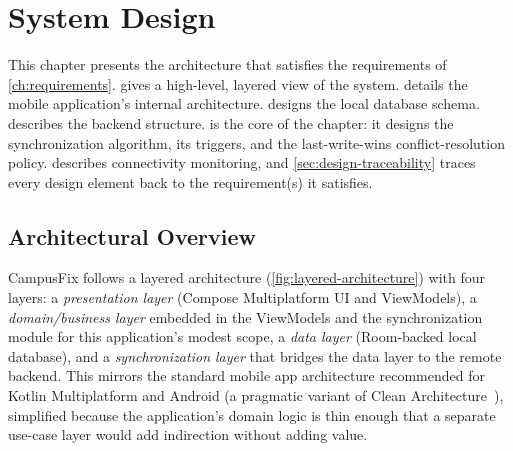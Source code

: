 \chapter{System Design}
\label{ch:design}

This chapter presents the architecture that satisfies the requirements of
\cref{ch:requirements}.  gives a high-level,
layered view of the system.  details the
mobile application's internal architecture. 
designs the local database schema.  describes the
backend structure.  is the core of the chapter: it
designs the synchronization algorithm, its triggers, and the
last-write-wins conflict-resolution policy. 
describes connectivity monitoring, and \cref{sec:design-traceability}
traces every design element back to the requirement(s) it satisfies.

\section{Architectural Overview}
\label{sec:architecture-overview}

CampusFix follows a layered architecture (\cref{fig:layered-architecture})
with four layers: a \emph{presentation layer} (Compose Multiplatform UI and
ViewModels), a \emph{domain/business layer} embedded in the ViewModels and
the synchronization module for this application's modest scope, a
\emph{data layer} (Room-backed local database), and a
\emph{synchronization layer} that bridges the data layer to the remote
backend. This mirrors the standard mobile app architecture recommended for
Kotlin Multiplatform and Android (a pragmatic variant of Clean
Architecture~\cite{martin2017clean, androidarch}), simplified because the
application's domain logic is thin enough that a separate use-case layer
would add indirection without adding value.

